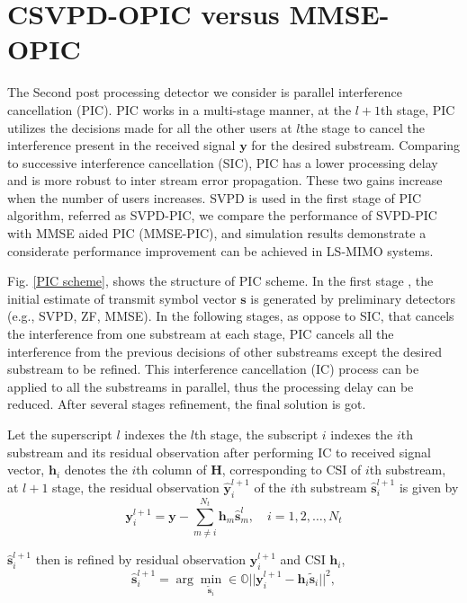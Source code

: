 \section{CSVPD-OPIC versus MMSE-OPIC}
The Second post processing detector we consider is parallel interference cancellation (PIC). PIC works in a multi-stage manner, at the $l+1$th stage, PIC utilizes the decisions made for all the other users at $l$the stage to cancel the interference present in the received signal $\mathbf{y}$ for the desired substream. Comparing to successive interference cancellation (SIC), PIC has a lower processing delay and is more robust to inter stream error propagation\cite{chin2002parallel}. These two gains increase when the number of users increases. SVPD is used in the first stage of PIC algorithm, referred as SVPD-PIC, we compare the performance of SVPD-PIC with MMSE aided PIC (MMSE-PIC), and simulation results demonstrate a considerate performance improvement can be achieved in LS-MIMO systems.

Fig. \ref{PIC scheme}, shows the structure of PIC scheme. In the first stage , the initial estimate of transmit symbol vector $\mathbf{s}$ is generated by preliminary detectors (e.g., SVPD, ZF, MMSE). In the following stages, as oppose to SIC, that cancels the interference from one substream at each stage, PIC cancels all the interference from the previous decisions of other substreams except the desired substream to be refined. This interference cancellation (IC) process can be applied to all the substreams in parallel, thus the processing delay can be reduced. After several stages refinement, the final solution is got.

Let the superscript $l$ indexes the $l$th stage, the subscript $i$ indexes the $i$th substream and its residual observation after performing IC to received signal vector, $\mathbf{h}_{i}$ denotes the $i$th column of $\mathbf{H}$, corresponding to CSI of $i$th substream, at $l+1$ stage, the residual observation $\hat{\mathbf{y}}^{l+1}_{i}$ of the $i$th substream $\hat{\mathbf{s}}^{l+1}_{i}$ is given by
\begin{equation}
\mathbf{y}^{l+1}_{i}=\mathbf{y}-\sum_{m\neq i}^{N_{t}}\mathbf{h}_{m}\hat{\mathbf{s}}^{l}_{m}, \quad i=1,2,\ldots, N_{t} 
\label{residual observation}
\end{equation}     

$\hat{\mathbf{s}}^{l+1}_{i}$ then is refined by residual  observation $\mathbf{y}^{l+1}_{i}$ and CSI $\mathbf{h}_{i}$, 
\begin{equation}
\hat{\mathbf{s}}^{l+1}_{i}=\arg\min_{\tilde{\mathbf{s}}_{i}}\in \mathbb{O}||\mathbf{y}^{l+1}_{i}-\mathbf{h}_{i}\tilde{\mathbf{s}}_{i}||^{2},
\label{refine PIC}
\end{equation}

